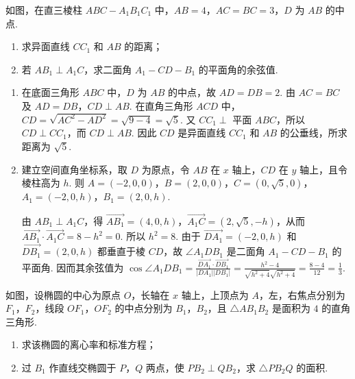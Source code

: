 \begin{problem}
如图，在直三棱柱 \(ABC-A_{1}B_{1}C_{1}\) 中，\(AB=4\)，\(AC=BC=3\)，\(D\) 为 \(AB\) 的中点.

\begin{enumerate}
\item 求异面直线 \(CC_{1}\) 和 \(AB\) 的距离；
\item 若 \(AB_{1}\perp A_{1}C\)，求二面角 \(A_{1}-CD-B_{1}\) 的平面角的余弦值.
\end{enumerate}

\end{problem}

\begin{solution}
\begin{enumerate}
\item 在底面三角形 \(ABC\) 中，\(D\) 为 \(AB\) 的中点，故 \(AD=DB=2\). 由 \(AC=BC\) 及 \(AD=DB\)，\(CD\perp AB\). 在直角三角形 \(ACD\) 中，\(CD=\sqrt{AC^2-AD^2}=\sqrt{9-4}=\sqrt5\). 又 \(CC_1\perp\) 平面 \(ABC\)，所以 \(CD\perp CC_1\)，而 \(CD\perp AB\). 因此 \(CD\) 是异面直线 \(CC_1\) 和 \(AB\) 的公垂线，所求距离为 \(\sqrt5\).
\item 建立空间直角坐标系，取 \(D\) 为原点，令 \(AB\) 在 \(x\) 轴上，\(CD\) 在 \(y\) 轴上，且令棱柱高为 \(h\). 则 \(A=(-2,0,0)\)，\(B=(2,0,0)\)，\(C=(0,\sqrt5,0)\)，\(A_1=(-2,0,h)\)，\(B_1=(2,0,h)\).

由 \(AB_1\perp A_1C\)，得 \(\overrightarrow{AB_1}=(4,0,h)\)，\(\overrightarrow{A_1C}=(2,\sqrt5,-h)\)，从而 \(\overrightarrow{AB_1}\cdot\overrightarrow{A_1C}=8-h^2=0\). 所以 \(h^2=8\). 由于 \(\overrightarrow{DA_1}=(-2,0,h)\) 和 \(\overrightarrow{DB_1}=(2,0,h)\) 都垂直于棱 \(CD\)，故 \(\angle A_1DB_1\) 是二面角 \(A_1-CD-B_1\) 的平面角. 因而其余弦值为 \(\cos\angle A_1DB_1=\frac{\overrightarrow{DA_1}\cdot\overrightarrow{DB_1}}{|DA_1||DB_1|}=\frac{h^2-4}{\sqrt{h^2+4}\sqrt{h^2+4}}=\frac{8-4}{12}=\frac13\).
\end{enumerate}
\end{solution}

\begin{problem}
如图，设椭圆的中心为原点 \(O\)，长轴在 \(x\) 轴上，上顶点为 \(A\)，左，右焦点分别为 \(F_{1}\)，\(F_{2}\)，线段 \(OF_{1}\)，\(OF_{2}\) 的中点分别为 \(B_{1}\)，\(B_{2}\)，且 \(\triangle AB_{1}B_{2}\) 是面积为 \(4\) 的直角三角形.

\begin{enumerate}
\item 求该椭圆的离心率和标准方程；
\item 过 \(B_{1}\) 作直线交椭圆于 \(P\)，\(Q\) 两点，使 \(PB_{2}\perp QB_{2}\)，求 \(\triangle PB_{2}Q\) 的面积.
\end{enumerate}

\end{problem}

